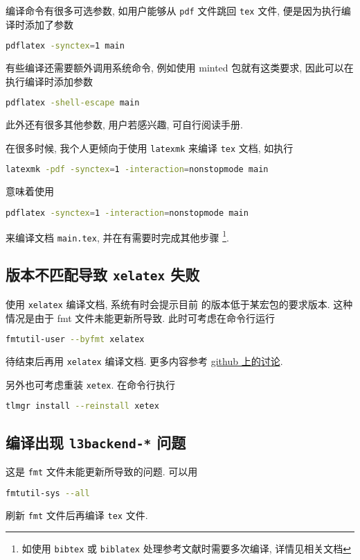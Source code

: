 编译命令有很多可选参数, 如用户能够从 \texttt{pdf} 文件跳回 \texttt{tex} 文件,
便是因为执行编译时添加了参数
\begin{lstlisting}[language=bash]
  pdflatex -synctex=1 main
\end{lstlisting}
有些编译还需要额外调用系统命令,
例如使用 \textsf{minted} 包就有这类要求,
因此可以在执行编译时添加参数
\begin{lstlisting}[language=bash]
  pdflatex -shell-escape main
\end{lstlisting}
此外还有很多其他参数, 用户若感兴趣, 可自行阅读手册. 

在很多时候, 我个人更倾向于使用 \texttt{latexmk} 来编译 \texttt{tex} 文档,
如执行
\begin{lstlisting}[language=bash]
  latexmk -pdf -synctex=1 -interaction=nonstopmode main
\end{lstlisting}
意味着使用 
\begin{lstlisting}[language=bash]
  pdflatex -synctex=1 -interaction=nonstopmode main
\end{lstlisting}
来编译文档 \texttt{main.tex}, 并在有需要时完成其他步骤%
\footnote{如使用 \texttt{bibtex} 或 \texttt{biblatex} 处理参考文献时需要多次编译,
详情见相关文档}. 

\subsection{\LaTeXe 版本不匹配导致 \texttt{xelatex} 失败}

使用 \texttt{xelatex} 编译文档,
系统有时会提示目前 \LaTeXe 的版本低于某宏包的要求版本.
这种情况是由于 \textsf{fmt} 文件未能更新所导致.
此时可考虑在命令行运行
\begin{lstlisting}[language=bash]
  fmtutil-user --byfmt xelatex
\end{lstlisting}
待结束后再用 \texttt{xelatex} 编译文档.
更多内容参考
\href{https://github.com/CTeX-org/forum/issues/70}{github 上的讨论}.

另外也可考虑重装 \texttt{xetex}.
在命令行执行
\begin{lstlisting}[language=bash]
  tlmgr install --reinstall xetex
\end{lstlisting}

\subsection{编译出现 \texttt{l3backend-*} 问题}

这是 \texttt{fmt} 文件未能更新所导致的问题.
可以用
\begin{lstlisting}[language=bash]
  fmtutil-sys --all
\end{lstlisting}
刷新 \texttt{fmt} 文件后再编译 \texttt{tex} 文件.

